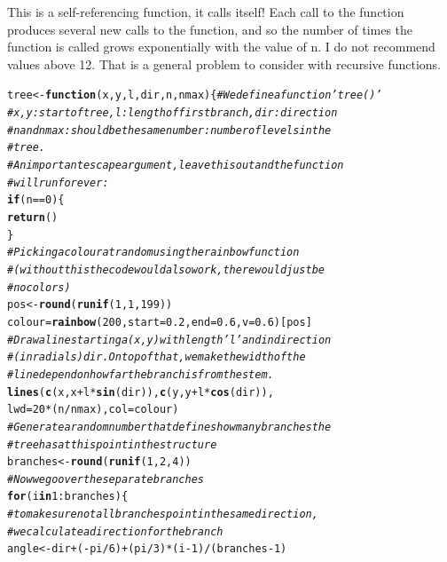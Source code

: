 \documentclass[12pt,a4paper]{scrartcl}\usepackage[]{graphicx}\usepackage[]{color}
\makeatletter
\newcommand{\hlnum}[1]{\textcolor[rgb]{0.686,0.059,0.569}{#1}}%
\newcommand{\hlcom}[1]{\textcolor[rgb]{0.678,0.584,0.686}{\textit{#1}}}%
\newcommand{\hlopt}[1]{\textcolor[rgb]{0,0,0}{#1}}%
\newcommand{\hlstd}[1]{\textcolor[rgb]{0.345,0.345,0.345}{#1}}%
\newcommand{\hlkwa}[1]{\textcolor[rgb]{0.161,0.373,0.58}{\textbf{#1}}}%
\newcommand{\hlkwb}[1]{\textcolor[rgb]{0.69,0.353,0.396}{#1}}%
\newcommand{\hlkwc}[1]{\textcolor[rgb]{0.333,0.667,0.333}{#1}}%
\newcommand{\hlkwd}[1]{\textcolor[rgb]{0.737,0.353,0.396}{\textbf{#1}}}%
\newenvironment{kframe}{%
 \def\at@end@of@kframe{}%
 \ifinner\ifhmode%
  \def\at@end@of@kframe{\end{minipage}}%
  \begin{minipage}{\columnwidth}%
 \fi\fi%
 \def\FrameCommand##1{\hskip\@totalleftmargin \hskip-\fboxsep
 \colorbox{shadecolor}{##1}\hskip-\fboxsep
     \hskip-\linewidth \hskip-\@totalleftmargin \hskip\columnwidth}%
 \MakeFramed {\advance\hsize-\width
   \@totalleftmargin\z@ \linewidth\hsize
   \@setminipage}}%
 {\par\unskip\endMakeFramed%
 \at@end@of@kframe}
\newenvironment{knitrout}{}{} %
\makeatother
\begin{document}
\begin{Answer}
This is a self-referencing function, it calls itself! Each call to the function produces several new calls to the function, and so the number of times the function is called grows exponentially with the value of n. I do not recommend values above 12. That is a general problem to consider with recursive functions. 
\begin{knitrout}
\color{fgcolor}\begin{kframe}
\begin{alltt}
\hlstd{tree}\hlkwb{<-}\hlkwa{function}\hlstd{(}\hlkwc{x}\hlstd{,}\hlkwc{y}\hlstd{,}\hlkwc{l}\hlstd{,}\hlkwc{dir}\hlstd{,}\hlkwc{n}\hlstd{,}\hlkwc{nmax}\hlstd{)\{} \hlcom{# We define a function 'tree()'}
\hlcom{# x,y: start of tree, l: length of first branch, dir: direction}
\hlcom{# n and nmax: should be the same number: number of levels in the}
\hlcom{# tree.}
\hlcom{# An important escape argument, leave this out and the function}
\hlcom{# will run forever:}
\hlkwa{if}\hlstd{(n}\hlopt{==}\hlnum{0}\hlstd{)\{}
\hlkwd{return}\hlstd{()}
\hlstd{\}}
\hlcom{# Picking a colour at random using the rainbow function}
\hlcom{# (without this the code would also work, there would just be}
\hlcom{# no colors)}
\hlstd{pos}\hlkwb{<-}\hlkwd{round}\hlstd{(}\hlkwd{runif}\hlstd{(}\hlnum{1}\hlstd{,}\hlnum{1}\hlstd{,}\hlnum{199}\hlstd{))}
\hlstd{colour}\hlkwb{=}\hlkwd{rainbow}\hlstd{(}\hlnum{200}\hlstd{,}\hlkwc{start}\hlstd{=}\hlnum{0.2}\hlstd{,}\hlkwc{end}\hlstd{=}\hlnum{0.6}\hlstd{,}\hlkwc{v}\hlstd{=}\hlnum{0.6}\hlstd{)[pos]}
\hlcom{# Draw a line starting a (x,y) with length 'l' and in direction}
\hlcom{# (in radials) dir. On top of that, we make the width of the}
\hlcom{# line depend on how far the branch is from the stem.}
\hlkwd{lines}\hlstd{(}\hlkwd{c}\hlstd{(x,x}\hlopt{+}\hlstd{l}\hlopt{*}\hlkwd{sin}\hlstd{(dir)),}\hlkwd{c}\hlstd{(y,y}\hlopt{+}\hlstd{l}\hlopt{*}\hlkwd{cos}\hlstd{(dir)),}
      \hlkwc{lwd}\hlstd{=}\hlnum{20}\hlopt{*}\hlstd{(n}\hlopt{/}\hlstd{nmax),}\hlkwc{col}\hlstd{=colour)}
\hlcom{# Generate a random number that defines how many branches the}
\hlcom{# tree has at this point in the structure}
\hlstd{branches}\hlkwb{<-}\hlkwd{round}\hlstd{(}\hlkwd{runif}\hlstd{(}\hlnum{1}\hlstd{,}\hlnum{2}\hlstd{,}\hlnum{4}\hlstd{))}
\hlcom{# Now we go over the separate branches}
\hlkwa{for}\hlstd{(i} \hlkwa{in} \hlnum{1}\hlopt{:}\hlstd{branches)\{}
\hlcom{# to make sure not all branches point in the same direction,}
\hlcom{# we calculate a direction for the branch}
\hlstd{angle}\hlkwb{<-}\hlstd{dir}\hlopt{+}\hlstd{(}\hlopt{-}\hlstd{pi}\hlopt{/}\hlnum{6}\hlstd{)}\hlopt{+}\hlstd{(pi}\hlopt{/}\hlnum{3}\hlstd{)}\hlopt{*}\hlstd{(i}\hlopt{-}\hlnum{1}\hlstd{)}\hlopt{/}\hlstd{(branches}\hlopt{-}\hlnum{1}\hlstd{)}

\end{alltt}
\end{kframe}
\end{knitrout}
\end{Answer}
\end{document}
